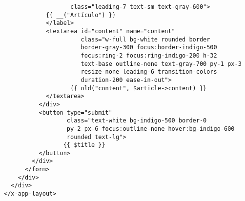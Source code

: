 \documentclass[11pt]{article}
\begin{document}
\begin{verbatim}
                   class="leading-7 text-sm text-gray-600">
            {{ __("Artículo") }}
            </label>
            <textarea id="content" name="content"
                      class="w-full bg-white rounded border
                      border-gray-300 focus:border-indigo-500
                      focus:ring-2 focus:ring-indigo-200 h-32
                      text-base outline-none text-gray-700 py-1 px-3
                      resize-none leading-6 transition-colors
                      duration-200 ease-in-out">
                   {{ old("content", $article->content) }}
            </textarea>
          </div>
          <button type="submit"
                  class="text-white bg-indigo-500 border-0
                  py-2 px-6 focus:outline-none hover:bg-indigo-600
                  rounded text-lg">
                 {{ $title }}
          </button>
        </div>
      </form>
    </div>
  </div>
</x-app-layout>
\end{verbatim}
\end{document}
